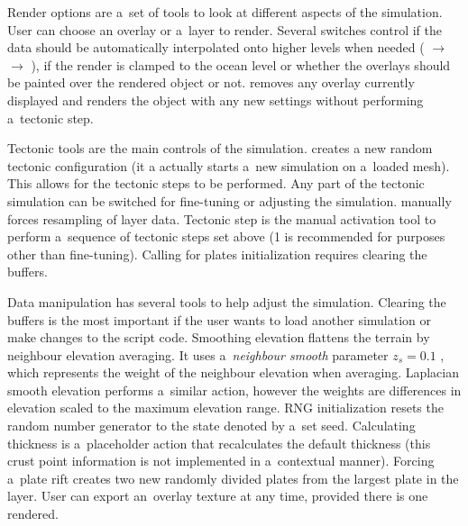 Render options are a~set of tools to look at different aspects of the simulation. User can choose an overlay or a~layer to render. Several switches control if the data should be automatically interpolated onto higher levels when needed ( $\rightarrow$  $\rightarrow$ ), if the render is clamped to the ocean level or whether the overlays should be painted over the rendered object or not.  removes any overlay currently displayed and  renders the object with any new settings without performing a~tectonic step.

Tectonic tools are the main controls of the simulation.  creates a new random tectonic configuration (it a actually starts a~new simulation on a~loaded mesh). This allows for the tectonic steps to be performed. Any part of the tectonic simulation can be switched for fine-tuning or adjusting the simulation.  manually forces resampling of  layer data. Tectonic step is the manual activation tool to perform a~sequence of tectonic steps set above (1 is recommended for purposes other than fine-tuning). Calling for plates initialization requires clearing the buffers.

Data manipulation has several tools to help adjust the simulation. Clearing the buffers is the most important if the user wants to load another simulation or make changes to the script code. Smoothing elevation flattens the terrain by neighbour elevation averaging. It uses a~\textit{neighbour smooth} parameter $z_s=0.1$ , which represents the weight of the neighbour elevation when averaging. Laplacian smooth elevation performs a~similar action, however the weights are differences in elevation scaled to the maximum elevation range. RNG initialization resets the random number generator to the state denoted by a~set seed. Calculating thickness is a~placeholder action that recalculates the default thickness (this crust point information is not implemented in a~contextual manner). Forcing a~plate rift creates two new randomly divided plates from the largest plate in the  layer. User can export an~overlay texture at any time, provided there is one rendered.

